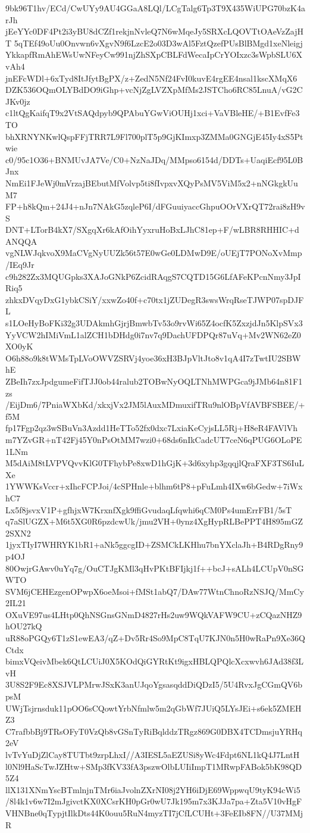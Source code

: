 9bk96T1hv/ECd/CwUYy9AU4GGaA8LQl/LCgTalg6Tp3T9X435WiUPG70bzK4arJh
jEeYYc0DF4Pt2i3yBU8dCZf1rekjnNvleQ7N6wMqeJy5SRXcLQOVTtOAeVzZajHT
5qTEf49oUu0Onvwn6vXgvN9f6LzcE2o03D3wAl5FztQzefPUsBlBMgd1xeNleigj
YkkapfRmAhEWsUwNFeyCw991njZhSXpCBLFdWecaIpCrYOIxzc3sWpbSLU6XvAh4
jnEFcWDl+6xTyd8ItJfytBgPX/z+ZedN5Nf24FvI0kuvE4rgEE4nsal1kscXMqX6
DZK536OQmOLYBdDO9iGhp+vcNjZgLVZXpMfMs2JSTCho6RC85LnuA/vG2CJKv0jz
c1ltQgKaifqT9x2VtSAQdpyb9QPAbuYGwViOUHj1xci+VaVBleHE/+B1EvfFe3TO
bhXRNYNKwlQspFFjTRR7L9Fl700plT5p9GjKImxp3ZMMa0GNGjE45Iy4xS5Ptwie
c0/95c1O36+BNMUvJA7Ve/C0+NzNaJDq/MMpso6154d/DDTs+UaqiEcf95L0BJnx
NmEi1FJeWj0mVrzajBEbutMfVolvp5ti8fIvpxvXQyPsMV5ViM5x2+nNGkgkUuM7
FP+h8kQm+24J4+nJn7NAkG5zqleP6I/dFGuuiyaccGhpuOOrVXrQT72rai8zH9vS
DNT+LTorB4kX7/SXgqXr6kAfOihYyxruHoBxLJhC81ep+F/wLBR8RHHIC+dANQQA
vgNLWJqkvoX9MaCVgNyUUZk56t57E0wGe0LDMwD9E/oUEjT7PONoXvMmp/IEq9Jr
c9h282Zx3MQUGpks3XAJoGNkP6ZcidRAqgS7CQTD15G6LfAFeKPcnNmy3JpIRiq5
zhkxDVqyDxG1ybkCSiY/xxwZo40f+c70tx1jZUDegR3swsWrqRseTJWP07spDJFL
s1LOeHyBoFKi32g3UDAkmhGjrjBmwbTv53o9rvWi65Z4ocfK5ZxzjdJn5KlpSVx3
YyVCW2hIMiVmL1alZCH1bDHdg0i7nv7q9DachUFDPQr87uVq+Mv2WN62eZ0XO0yK
O6h88o9k8tWMsTpLVoOWVZSRVj4yoe36xH3BJpVltJto8v1qA4I7zTwtIU2SBWhE
ZBeIh7zxJpdgumeFifTJJ0ob44ralub2TOBwNyOQLTNhMWPGca9jJMb64n81F1zs
/EijDm6/7PniaWXbKd/xkxjVx2JM5lAuxMDmuxifTRu9nlOBpVfAVBFSBEE/+f5M
fp17Fgp2qz3wSBuVn3Azdd1HeTTo52fx0dxc7LxiaKeCyjsLL5Rj+H8eR4FAVlVh
m7YZvGR+nT42Fj45Y0nPsOtMM7wzi0+68ds6nIkCadcUT7ceN6qPUG6OLoPE1LNm
M5dAiM8tLVPVQvvKlG0TFhybPe8xwD1hGjK+3d6xyhp3gqqjlQraFXF3TS6IuLXe
1YWWKsVccr+xIhcFCPJoi/4cSPHnle+blhm6tP8+pFuLmh4IXw6bGedw+7iWxhC7
Lx5f8jsvxV1P+gfhjxW7KrxnfXgk9ffiGvudaqLfqwhi6qCM0Ps4umErrFB1/5sT
q7aSlUGZX+M6t5XG0R6pzdcwUk/jmu2VH+0ynz4XgHypRLBePPT4H895mGZ2SXN2
1jyxTIyI7WHRYK1bR1+aNk5ggcgID+ZSMCkLKHhu7bnYXclaJh+B4RDgRny9p4OJ
80OwjrGAwv0uYq7g/OuCTJgKMl3qHvPKtBFIjkj1f++bcJ+sALh4LCUpV0nSGWTO
SVM6jCEHEzgenOPwpX6oeMsoi+fMSt1abQ7/DAw77WtnChnoRzNSJQ/MmCy2IL21
OXuVE97us4LHtp0QhNSGnsGNmD4827rHs2uw9WQkVAFW9CU+zCQazNHZ9hOU27kQ
uR88oPGQy6T1zS1ewEA3/qZ+Dv5Rr4So9MpC8TqU7KJN0n5H0wRaPn9Xe36QCtdx
bimxVQeivMbek6QtLCUiJ0X5KOdQiGYRtKt9igxHBLQPQlcXcxwvh6JAd38f3LvH
3U8S2F9Ec8XSJVLPMrwJSxK3anUJqoYgsasqddDiQDzI5/5U4RvxJgCGmQV6bpsM
UWjTsjrnsduk11pOO6sCQowtYrbNfmlw5m2qGbWf7JUiQ5LYsJEi+s6ek5ZMEHZ3
C7rafbbBj9TRsOFyT0VzQb8vGSnTyRiBqlddzTRgz869G0DBX4TCDmsjuYRHq2eV
lvTvYuDjZlCay8TUTbt9zrpLhxI//A3IESL5aEZUSi8yWc4Fdpt6NL1kQ4J7LntH
l0Nl9HaScTwJZHtw+SMp3fKV33fA3pszwOlbLUIiImpT1MRwpFABok5bK98QD5Z4
llX131XNmYscBTmlnjnTMr6iaJvolnZXrNI08j2YH6iDjE69WppwqU9tyK94cWi5
/8l4k1v6w7I2mJgivctKX0XCsrKH0pGr0wU7Jk195m7x3KJJa7pa+Zta5V10vHgF
VHNBne0qTypjtIlkDts44K0ouu5RuN4myzTI7jCfLCUHt+3FeEIb8FN//U37MMjR
